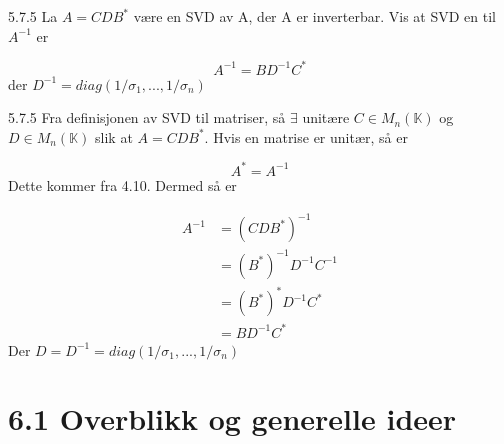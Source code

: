 \documentclass[a4paper,norsk]{article}
\begin{document}
\begin{oppgavebox}{5.7.5}{}
La $ A = CDB^* $ være en SVD av A, der A er inverterbar. Vis at SVD en til $ A^{-1} $ er

\[
    A^{-1} = BD^{-1} C^*
\]
der $ D^{-1} = diag \left( 1 / \sigma _{ 1} , ..., 1/ \sigma _{ n}  \right)  $ 
\begin{proofbox}{5.7.5}{}
Fra definisjonen av SVD til matriser, så $ \exists $ unitære $ C \in M_n(\mathbb{K}) $ og $ D \in M_n(\mathbb{K}) $  slik at $ A = CDB^* $. Hvis en matrise er unitær, så er

\[
    A^* = A^{-1}
\]
Dette kommer fra 4.10. Dermed så er 

\begin{align*}
    A^{-1} &= \left( CDB^* \right) ^{-1} \\
    &= \left( B^* \right) ^{-1} D^{-1} C^{-1} \\
    &= \left( B^* \right) ^* D^{-1} C^* \\
    &= B D^{-1} C^*
\end{align*}
Der $ D = D^{-1} = diag \left( 1 / \sigma _{ 1} , ..., 1/ \sigma _{ n}  \right) $ 
\end{proofbox}
\end{oppgavebox}

\section*{6.1 Overblikk og generelle ideer}
\end{document}
